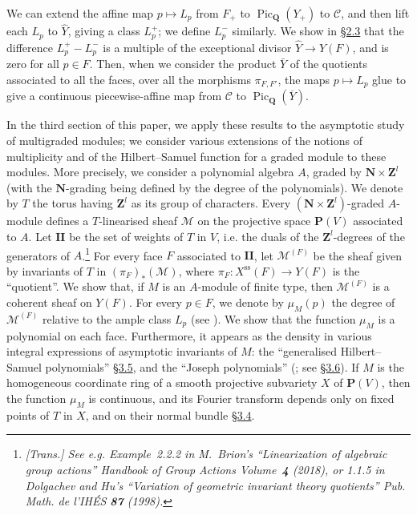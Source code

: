 \documentclass{article}
\theoremstyle{plain}
\theoremstyle{definition}
\newcommand{\scr}[1]{{\mathscr{#1}}}
\newcommand{\PP}{\mathbf{P}}
\newcommand{\QQ}{\mathbf{Q}}
\newcommand{\NN}{\mathbf{N}}
\newcommand{\ZZ}{\mathbf{Z}}
\renewcommand{\ss}{\mathrm{ss}}
\newcommand{\II}{\mathbf{II}}
\DeclareMathOperator{\Pic}{Pic}
\newcommand{\oldpage}[1]{\marginpar{\footnotesize$\Big\vert$ \textit{p.~#1}}}
\begin{document}
We can extend the affine map $p\mapsto L_p$ from $F_+$ to $\Pic_\QQ(Y_+)$ to $\mathcal{C}$, and then lift each $L_p$ to $\hat{Y}$, giving a class $L_p^+$;
we define $L_p^-$ similarly.
We show in \hyperref[2.3]{\S2.3} that the difference $L_p^+ - L_p^-$ is a multiple of the exceptional divisor $\hat{Y}\to Y(F)$, and is zero for all $p\in F$.
Then, when we consider the product $\bar{Y}$ of the quotients associated to all the faces, over all the morphisms $\pi_{F,F'}$, the maps $p\mapsto L_p$ glue to give a continuous piecewise-affine map from $\mathcal{C}$ to $\Pic_\QQ(\overline{Y})$.

In the third section of this paper, we apply these results to the asymptotic study of multigraded modules;
we consider various extensions of the notions of multiplicity and of the Hilbert--Samuel function for a graded module to these modules.
More precisely, we consider a polynomial algebra $A$, graded by $\NN\times\ZZ^l$ (with the $\NN$-grading being defined by the degree of the polynomials).
We denote by $T$ the torus having $\ZZ^l$ as its group of characters.
Every $(\NN\times\ZZ^l)$-graded $A$-module defines
\oldpage{511}
a $T$-linearised sheaf $\scr{M}$ on the projective space $\PP(V)$ associated to $A$.
Let $\II$ be the set of weights of $T$ in $V$, i.e. the duals of the $\ZZ^l$-degrees of the generators of $A$.\footnote{\emph{[Trans.] See e.g. Example~2.2.2 in M.~Brion's ``Linearization of algebraic group actions'' \emph{Handbook of Group Actions} Volume~\textbf{4} (2018), or 1.1.5 in Dolgachev and Hu's ``Variation of geometric invariant theory quotients'' \emph{Pub. Math. de l'IH\'{E}S} \textbf{87} (1998).}}
For every face $F$ associated to $\II$, let $\scr{M}^{(F)}$ be the sheaf given by invariants of $T$ in $(\pi_F)_*(\scr{M})$, where $\pi_F\colon X^\ss(F)\to Y(F)$ is the ``quotient''.
We show that, if $M$ is an $A$-module of finite type, then $\scr{M}^{(F)}$ is a coherent sheaf on $Y(F)$.
For every $p\in F$, we denote by $\mu_M(p)$ the degree of $\scr{M}^{(F)}$ relative to the ample class $L_p$ (see \cite[I.3]{Kle}).
We show that the function $\mu_M$ is a polynomial on each face.
Furthermore, it appears as the density in various integral expressions of asymptotic invariants of $M$: the ``generalised Hilbert--Samuel polynomials'' \hyperref[3.5]{\S3.5}, and the ``Joseph polynomials'' (\cite{Jos}; see \hyperref[3.6]{\S3.6}).
If $M$ is the homogeneous coordinate ring of a smooth projective subvariety $X$ of $\PP(V)$, then the function $\mu_M$ is continuous, and its Fourier transform depends only on fixed points of $T$ in $X$, and on their normal bundle \hyperref[3.4]{\S3.4}.
\end{document}
